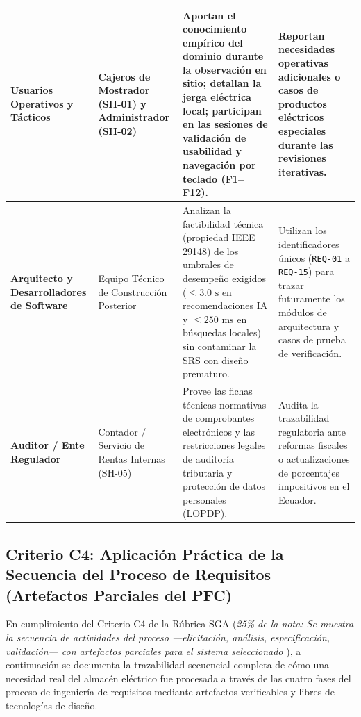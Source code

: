 \documentclass[conference,10pt]{IEEEtran}
\begin{document}
\begin{table}[htbp]
\begin{tabularx}{\textwidth}{>{\raggedright\arraybackslash}p{} >{\raggedright\arraybackslash}p{} Y Y}
			\midrule
			\textbf{Usuarios Operativos y Tácticos} & Cajeros de Mostrador (SH-01) y Administrador (SH-02) & Aportan el conocimiento empírico del dominio durante la observación en sitio; detallan la jerga eléctrica local; participan en las sesiones de validación de usabilidad y navegación por teclado (F1--F12). & Reportan necesidades operativas adicionales o casos de productos eléctricos especiales durante las revisiones iterativas. \\
			\midrule
			\textbf{Arquitecto y Desarrolladores de Software} & Equipo Técnico de Construcción Posterior & Analizan la factibilidad técnica (propiedad IEEE 29148) de los umbrales de desempeño exigidos ($\le 3.0\text{ s}$ en recomendaciones IA y $\le 250\text{ ms}$ en búsquedas locales) sin contaminar la SRS con diseño prematuro. & Utilizan los identificadores únicos (\texttt{REQ-01} a \texttt{REQ-15}) para trazar futuramente los módulos de arquitectura y casos de prueba de verificación. \\
			\midrule
			\textbf{Auditor / Ente Regulador} & Contador / Servicio de Rentas Internas (SH-05) & Provee las fichas técnicas normativas de comprobantes electrónicos y las restricciones legales de auditoría tributaria y protección de datos personales (LOPDP). & Audita la trazabilidad regulatoria ante reformas fiscales o actualizaciones de porcentajes impositivos en el Ecuador. \\
			\bottomrule
		\end{tabularx}
	\end{table}
	\subsection{Criterio C4: Aplicación Práctica de la Secuencia del Proceso de Requisitos (Artefactos Parciales del PFC)}
	En cumplimiento del Criterio C4 de la Rúbrica SGA (\textit{25\% de la nota: Se muestra la secuencia de actividades del proceso —elicitación, análisis, especificación, validación— con artefactos parciales para el sistema seleccionado} \cite{ieee29148, pohl2025}), a continuación se documenta la trazabilidad secuencial completa de cómo una necesidad real del almacén eléctrico fue procesada a través de las cuatro fases del proceso de ingeniería de requisitos mediante artefactos verificables y libres de tecnologías de diseño.
\end{document}
